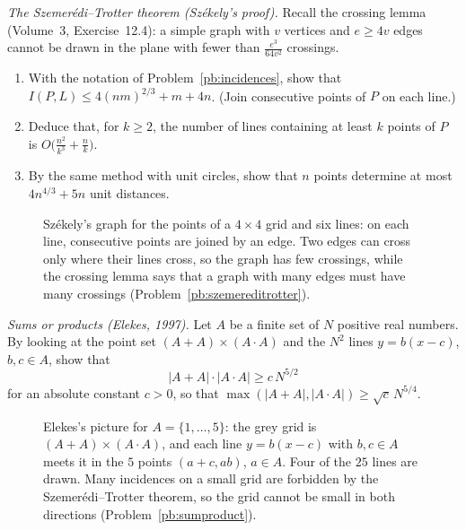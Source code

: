 \begin{exercise}[$\star\star\star$]\label{pb:szemereditrotter}
\emph{The Szemerédi--Trotter theorem (Székely's proof).} Recall the crossing lemma (Volume~3, Exercise~12.4): a simple graph with
$v$ vertices and $e\ge4v$ edges cannot be drawn in the plane with fewer than $\frac{e^3}{64v^2}$ crossings.
\begin{enumerate}[label=(\alph*)]
\item With the notation of Problem~\ref{pb:incidences}, show that $I(P,L)\le4(nm)^{2/3}+m+4n$. (Join consecutive points of $P$ on
each line.)
\item Deduce that, for $k\ge2$, the number of lines containing at least $k$ points of $P$ is $O\bigl(\frac{n^2}{k^3}+\frac nk\bigr)$.
\item By the same method with unit circles, show that $n$ points determine at most $4n^{4/3}+5n$ unit distances.
\end{enumerate}
\end{exercise}

\begin{figure}[ht]
\centering
{}
\caption{Székely's graph for the points of a $4\times4$ grid and six lines: on each line, consecutive points are joined by an edge.
Two edges can cross only where their lines cross, so the graph has few crossings, while the crossing lemma says that a graph with many
edges must have many crossings (Problem~\ref{pb:szemereditrotter}).}
\label{fig:szekely}
\end{figure}

\begin{exercise}[$\star\star$]\label{pb:sumproduct}
\emph{Sums or products (Elekes, 1997).} Let $A$ be a finite set of $N$ positive real numbers. By looking at the point set
$(A+A)\times(A\cdot A)$ and the $N^2$ lines $y=b(x-c)$, $b,c\in A$, show that
\[
|A+A|\cdot|A\cdot A|\ge c\,N^{5/2}
\]
for an absolute constant $c>0$, so that $\max(|A+A|,|A\cdot A|)\ge\sqrt c\,N^{5/4}$.
\end{exercise}

\begin{figure}[ht]
\centering
{}
\caption{Elekes's picture for $A=\{1,\dots,5\}$: the grey grid is $(A+A)\times(A\cdot A)$, and each line $y=b(x-c)$ with $b,c\in A$ meets
it in the $5$ points $(a+c,ab)$, $a\in A$. Four of the $25$ lines are drawn. Many incidences on a small grid are forbidden by the
Szemerédi--Trotter theorem, so the grid cannot be small in both directions (Problem~\ref{pb:sumproduct}).}
\label{fig:elekes}
\end{figure}

